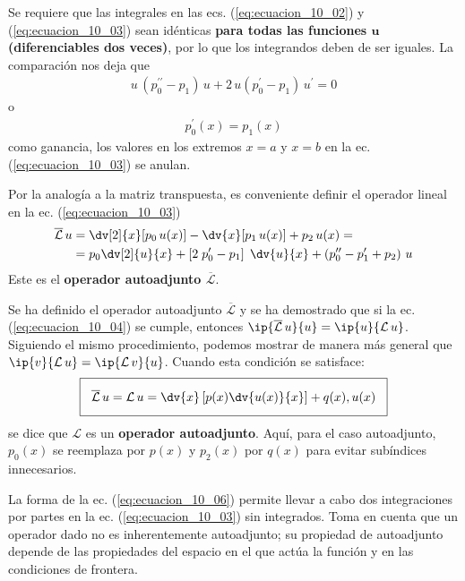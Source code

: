 Se requiere que las integrales en las ecs. (\ref{eq:ecuacion_10_02}) y (\ref{eq:ecuacion_10_03}) sean idénticas \textbf{para todas las funciones $\bm{u}$ (diferenciables dos veces)}, por lo que los integrandos deben de ser iguales. La comparación nos deja que
\begin{align*}
u \, (p_{0}^{\prime \prime} - p_{1}) \, u + 2 \, u (p_{0}^{\prime} - p_{1}) \, u^{\prime} = 0
\end{align*}
o
\begin{align}
p_{0}^{\prime} (x) = p_{1} (x)
\label{eq:ecuacion_10_04}
\end{align}
como ganancia, los valores en los extremos $x=a$ y $x=b$ en la ec. (\ref{eq:ecuacion_10_03}) se anulan.
\par
Por la analogía a la matriz transpuesta, es conveniente definir el operador lineal en la ec. (\ref{eq:ecuacion_10_03})
\begin{align}
\begin{aligned}
\overline{\mathcal{L}} \, u &= \dv[2]{x} [ p_{0} \, u(x)] - \dv{x} [p_{1} \, u(x)] + p_{2} \, u(x) = \\
&= p_{0} \dv[2]{u}{x} + \left[ 2 \; p_{0}^{\prime} - p_{1} \right] \; \dv{u}{x} + \left( p_{0}^{\prime \prime} - p_{1}^{\prime} + p_{2} \right) \, u
\label{eq:ecuacion_10_05}
\end{aligned}
\end{align}
Este es el \textbf{operador autoadjunto $\overline{\mathcal{L}}$}.
\par 
Se ha definido el operador autoadjunto $\overline{\mathcal{L}}$ y se ha demostrado que si la ec. (\ref{eq:ecuacion_10_04}) se cumple, entonces $\ip{\overline{\mathcal{L}} \, u}{u} = \ip{u}{\mathcal{L} \, u}$. Siguiendo el mismo procedimiento, podemos mostrar de manera más general que $\ip{v}{\mathcal{L} \, u} = \ip{\mathcal{L} \, v}{u}$. Cuando esta condición se satisface:
\begin{equation}
\setlength{\fboxsep}{3\fboxsep}\boxed{\overline{\mathcal{L}} \, u = \mathcal{L} \, u = \dv{x} \left[ p(x) \dv{u(x)}{x} \right] + q(x) , u(x)}
\label{eq:ecuacion_10_06}
\end{equation}
se dice que $\mathcal{L}$ es un \textbf{operador autoadjunto}. Aquí, para el caso autoadjunto, $p_{0}(x)$ se reemplaza por $p(x)$ y $p_{2}(x)$ por $q(x)$ para evitar subíndices innecesarios.
\par
La forma de la ec. (\ref{eq:ecuacion_10_06}) permite llevar a cabo dos integraciones por partes en la ec. (\ref{eq:ecuacion_10_03}) sin integrados. Toma en cuenta que un operador dado no es inherentemente autoadjunto; su propiedad de autoadjunto depende de las propiedades del espacio en el que actúa la función y en las condiciones de frontera.
